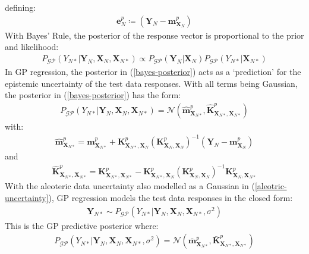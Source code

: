 \documentclass{article}
\newcommand{\GP}{\operatorname{\mathcal{GP}}}
\numberwithin{equation}{section}
\begin{document}
defining:
\begin{align}
    \mathbf{e}^p_N \coloneqq \left(\mathbf{Y}_N - \mathbf{m}^p_{\mathbf{X}_{N}} \right)
    \label{mean-error-definition}
\end{align}
With Bayes' Rule, the posterior of the response vector is proportional to the prior and likelihood:
\begin{align}
     P_{\GP}\left(Y_{N*} | \mathbf{Y}_{N},  \mathbf{X}_{N},  \mathbf{X}_{N*}\right) \propto P_{\GP}\left(\mathbf{Y}_{N} \vert \mathbf{X}_{N} \right) P_{\GP}\left(Y_{N*}\vert \mathbf{X}_{N*}\right)
    \label{bayes-posterior}
\end{align}
In GP regression, the posterior in (\ref{bayes-posterior}) acts as a `prediction' for the epistemic uncertainty of the test data responses. With all terms being Gaussian, the posterior in (\ref{bayes-posterior}) has the form:
\begin{align}
    P_{\GP}\left(Y_{N*} | \mathbf{Y}_{N},  \mathbf{X}_{N},  \mathbf{X}_{N*}\right)  =  \mathcal{N}\left(\hat{\mathbf{m}}^p_{\mathbf{X}_{N*}}, \hat{\mathbf{K}}^p_{\mathbf{X}_{N*}, \mathbf{X}_{N*}}\right)
    \label{gp-epistemic-posterior}
\end{align}
with:
\begin{align}
    \label{gp-epistemic-posterior-mean}
    \hat{\mathbf{m}}^p_{\mathbf{X}_{N*}} = \mathbf{m}^p_{\mathbf{X}_{N*}} + \mathbf{K}^p_{\mathbf{X}_{N*}, \mathbf{X}_N} \left(\mathbf{K}^p_{\mathbf{X}_N, \mathbf{X}_N}\right)^{-1} \left( \mathbf{Y}_N - \mathbf{m}^p_{\mathbf{X}_N}\right)
\end{align}
and
\begin{align}
    \label{gp-epistemic-posterior-covariance}
    \hat{\mathbf{K}}^p_{\mathbf{X}_{N*}, \mathbf{X}_{N*}} = \mathbf{K}^p_{\mathbf{X}_{N*}, \mathbf{X}_{N*}} - \mathbf{K}^p_{\mathbf{X}_{N*}, \mathbf{X}_N}\left(\mathbf{K}^p_{\mathbf{X}_N, \mathbf{X}_N}\right)^{-1}\mathbf{K}^p_{\mathbf{X}_N, \mathbf{X}_{N*}}
\end{align}
With the aleoteric data uncertainty also modelled as a Gaussian in (\ref{aleotric-uncertainty}), GP regression models the test data responses in the closed form:
\begin{align}
    \mathbf{Y}_{N*} \sim P_{\GP}\left(Y_{N*} \vert \mathbf{Y}_N, \mathbf{X}_N, \mathbf{X}_{N*}, \sigma^2\right)
    \label{gp-posterior}
\end{align}
This is the GP predictive posterior where:
\begin{align}
    P_{\GP}\left(Y_{N*} \vert \mathbf{Y}_N, \mathbf{X}_N, \mathbf{X}_{N*}, \sigma^2\right) = \mathcal{N}\left(\bar{\mathbf{m}}^p_{\mathbf{X}_{N*}}, \bar{\mathbf{K}}^p_{\mathbf{X}_{N*}, \mathbf{X}_{N*}}\right)
    \label{gp-posterior-normal}
\end{align}
\end{document}
